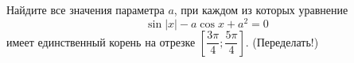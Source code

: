 \begin{ex}
	\begin{condition}
		Найдите все значения параметра \( a \), при каждом из которых уравнение \[ \sin|x| - a\cos x+a^2=0 \] имеет единственный корень на отрезке \( \left[ \dfrac{3\pi}{4};\dfrac{5\pi}{4} \right] \).
		(Переделать!)
	\end{condition}
\end{ex}